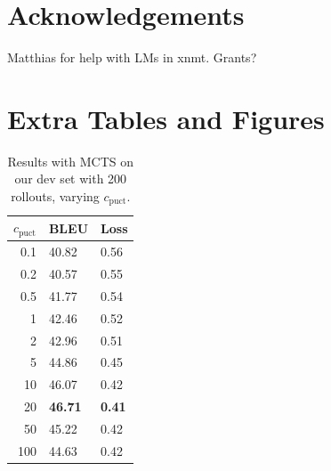 \documentclass[11pt,a4paper]{article}
\begin{document}
\section*{Acknowledgements}
\label{sec:acknowledgements}
Matthias for help with LMs in xnmt.
Grants?




\clearpage

\appendix
\section{Extra Tables and Figures}

\begin{table}
\centering
\begin{tabular}{r l l}
\toprule
$c_{\text{puct}}$ & BLEU & Loss \\
\midrule
0.1 & 40.82 & 0.56 \\
0.2 & 40.57 & 0.55 \\
0.5 & 41.77 & 0.54 \\
1 & 42.46 & 0.52 \\
2 & 42.96 & 0.51 \\
5 & 44.86 & 0.45 \\
10 & 46.07 & 0.42 \\
20 & \textbf{46.71} & \textbf{0.41} \\
50 & 45.22 & 0.42 \\
100 & 44.63 & 0.42 \\
\bottomrule
\end{tabular}
\caption{Results with MCTS on our dev set with 200 rollouts, varying $c_{\text{puct}}$.}
\label{tab:btec_mcts_cpuct}
\end{table}
\end{document}
